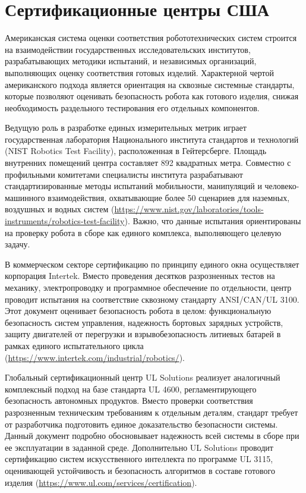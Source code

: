 \newpage
\section{Сертификационные центры США}

Американская система оценки соответствия робототехнических систем строится на взаимодействии государственных исследовательских институтов, разрабатывающих методики испытаний, и независимых организаций, выполняющих оценку соответствия готовых изделий. Характерной чертой американского подхода является ориентация на сквозные системные стандарты, которые позволяют оценивать безопасность робота как готового изделия, снижая необходимость раздельного тестирования его отдельных компонентов.

Ведущую роль в разработке единых измерительных метрик играет государственная лаборатория Национального института стандартов и технологий (NIST Robotics Test Facility), расположенная в Гейтерсберге. Площадь внутренних помещений центра составляет 892 квадратных метра. Совместно с профильными комитетами специалисты института разрабатывают стандартизированные методы испытаний мобильности, манипуляций и человеко-машинного взаимодействия, охватывающие более 50 сценариев для наземных, воздушных и водных систем (\url{https://www.nist.gov/laboratories/tools-instruments/robotics-test-facility}). Важно, что данные испытания ориентированы на проверку робота в сборе как единого комплекса, выполняющего целевую задачу.

В коммерческом секторе сертификацию по принципу единого окна осуществляет корпорация Intertek. Вместо проведения десятков разрозненных тестов на механику, электропроводку и программное обеспечение по отдельности, центр проводит испытания на соответствие сквозному стандарту ANSI/CAN/UL 3100. Этот документ оценивает безопасность робота в целом: функциональную безопасность систем управления, надежность бортовых зарядных устройств, защиту двигателей от перегрузки и взрывобезопасность литиевых батарей в рамках единого испытательного цикла (\url{https://www.intertek.com/industrial/robotics/}).

Глобальный сертификационный центр UL Solutions реализует аналогичный комплексный подход на базе стандарта UL 4600, регламентирующего безопасность автономных продуктов. Вместо проверки соответствия разрозненным техническим требованиям к отдельным деталям, стандарт требует от разработчика подготовить единое доказательство безопасности системы. Данный документ подробно обосновывает надежность всей системы в сборе при ее эксплуатации в заданной среде. Дополнительно UL Solutions проводит сертификацию систем искусственного интеллекта по программе UL 3115, оценивающей устойчивость и безопасность алгоритмов в составе готового изделия (\url{https://www.ul.com/services/certification}).

